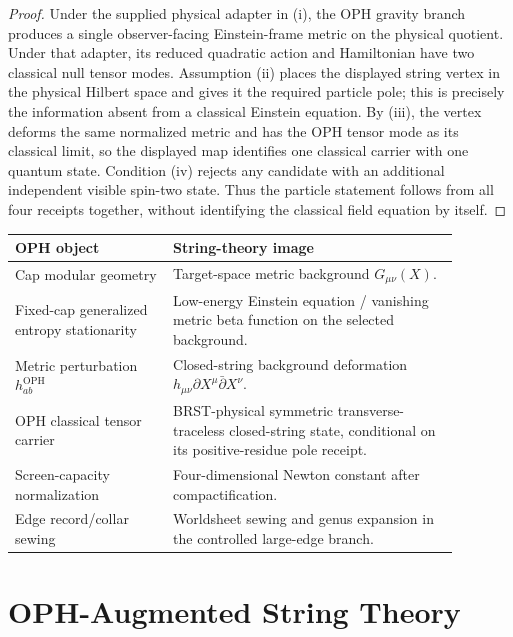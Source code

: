 \documentclass[11pt]{article}
\theoremstyle{remark}
\theoremstyle{plain}
\newcommand{\OPH}{\mathrm{OPH}}
\begin{document}
\begin{proof}
Under the supplied physical adapter in (i), the OPH gravity branch produces a single
observer-facing Einstein-frame metric on the physical quotient. Under that adapter, its
reduced quadratic action and Hamiltonian have two classical null tensor
modes. Assumption (ii) places the displayed string vertex in the physical Hilbert space and gives
it the required particle pole; this is precisely the information absent from a classical Einstein
equation. By (iii), the vertex deforms the same normalized metric and has the OPH tensor mode as its
classical limit, so the displayed map identifies one classical carrier with one quantum state.
Condition (iv) rejects any candidate with an additional independent visible spin-two state. Thus
the particle statement follows from all four receipts together, without identifying the classical
field equation by itself.
\end{proof}

\begin{center}
\small
\begin{tabular}{L{0.31\linewidth}L{0.57\linewidth}}
\toprule
\textbf{OPH object} & \textbf{String-theory image} \\
\midrule
Cap modular geometry & Target-space metric background \(G_{\mu\nu}(X)\). \\
Fixed-cap generalized entropy stationarity & Low-energy Einstein equation / vanishing metric beta function on the selected background. \\
Metric perturbation \(h^{\OPH}_{ab}\) & Closed-string background deformation \(h_{\mu\nu}\partial X^\mu\bar\partial X^\nu\). \\
OPH classical tensor carrier & BRST-physical symmetric transverse-traceless closed-string state,
conditional on its positive-residue pole receipt. \\
Screen-capacity normalization & Four-dimensional Newton constant after compactification. \\
Edge record/collar sewing & Worldsheet sewing and genus expansion in the controlled large-edge branch. \\
\bottomrule
\end{tabular}
\end{center}

\section{OPH-Augmented String Theory}\label{sec:oph-augmented-string}
\end{document}
